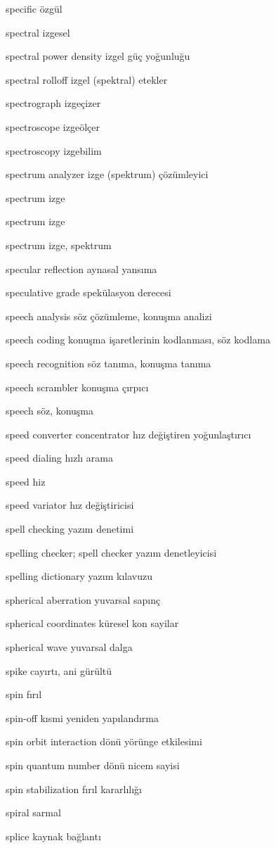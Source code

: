 \documentclass[12pt,fleqn]{article}\usepackage{../../common}
\begin{document}
specific özgül

spectral izgesel

spectral power density izgel güç yoğunluğu

spectral rolloff izgel (spektral) etekler

spectrograph izgeçizer

spectroscope izgeölçer

spectroscopy izgebilim

spectrum analyzer izge (spektrum) çözümleyici

spectrum izge

spectrum izge

spectrum izge, spektrum

specular reflection aynasal yansıma

speculative grade spekülasyon derecesi

speech analysis söz çözümleme, konuşma analizi

speech coding konuşma işaretlerinin kodlanması, söz kodlama

speech recognition söz tanıma, konuşma tanıma

speech scrambler konuşma çırpıcı

speech söz, konuşma

speed converter concentrator hız değiştiren yoğunlaştırıcı

speed dialing hızlı arama

speed hiz

speed variator hız değiştiricisi

spell checking yazım denetimi

spelling checker; spell checker yazım denetleyicisi

spelling dictionary yazım kılavuzu

spherical aberration yuvarsal sapınç

spherical coordinates küresel kon sayilar

spherical wave yuvarsal dalga

spike cayırtı, ani gürültü

spin fırıl

spin-off kısmi yeniden yapılandırma

spin orbit interaction dönü yörünge etkilesimi

spin quantum number dönü nicem sayisi

spin stabilization fırıl kararlılığı

spiral sarmal

splice kaynak bağlantı
\end{document}
